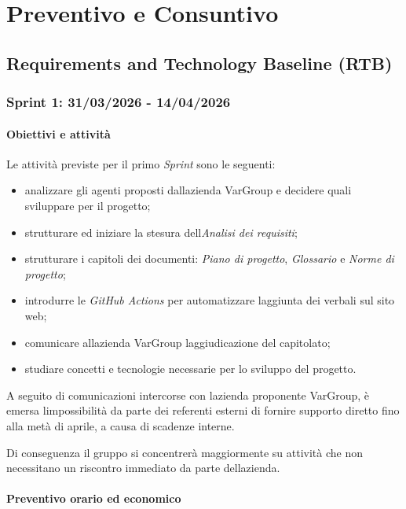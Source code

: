 \documentclass[12pt, a4paper]{article}
\begin{document}
{\section{Preventivo e Consuntivo}

\subsection{Requirements and Technology Baseline (RTB)}

\subsubsection{Sprint 1: 31/03/2026 - 14/04/2026}

\paragraph{Obiettivi e attività}

Le attività previste per il primo \emph{Sprint} sono le seguenti:

\begin{itemize}
\item
  analizzare gli agenti proposti dall\textquotesingle azienda VarGroup e
  decidere quali sviluppare per il progetto;
\item
  strutturare ed iniziare la stesura dell\textquotesingle\emph{Analisi
  dei requisiti};
\item
  strutturare i capitoli dei documenti: \emph{Piano di progetto},
  \emph{Glossario} e \emph{Norme di progetto};
\item
  introdurre le \emph{GitHub Actions} per automatizzare
  l\textquotesingle aggiunta dei verbali sul sito web;
\item
  comunicare all\textquotesingle azienda VarGroup
  l\textquotesingle aggiudicazione del capitolato;
\item
  studiare concetti e tecnologie necessarie per lo sviluppo del
  progetto.
\end{itemize}

A seguito di comunicazioni intercorse con l\textquotesingle azienda
proponente VarGroup, è emersa l\textquotesingle impossibilità da parte
dei referenti esterni di fornire supporto diretto fino alla metà di
aprile, a causa di scadenze interne.

Di conseguenza il gruppo si concentrerà maggiormente su attività che non
necessitano un riscontro immediato da parte
dell\textquotesingle azienda.

\paragraph{Preventivo orario ed economico}

}
\end{document}
